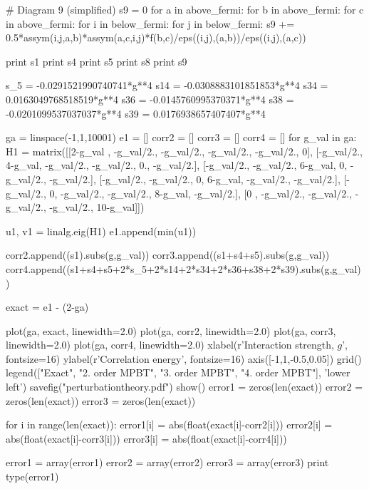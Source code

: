\documentclass[%
twoside,                 %
final,                   %
10pt]{article}
\newenvironment{doconceexercise}{}{}
\begin{document}
\begin{doconceexercise}
# Diagram 9 (simplified)
s9 = 0 
for a in above_fermi:
	for b in above_fermi:
		for c in above_fermi:
			for i in below_fermi:
				for j in below_fermi:
					s9 += 0.5*assym(i,j,a,b)*assym(a,c,i,j)*f(b,c)/eps((i,j),(a,b))/eps((i,j),(a,c))


print s1
print s4
print s5
print s8
print s9

s_5 =  -0.0291521990740741*g**4
s14 =  -0.0308883101851853*g**4
s34 =  0.0163049768518519*g**4
s36 =  -0.0145760995370371*g**4
s38 =  -0.0201099537037037*g**4
s39 =  0.0176938657407407*g**4

ga = linspace(-1,1,10001)
e1 = []
corr2 = []
corr3 = []
corr4 = []
for g_val in ga:
	H1 = matrix([[2-g_val , -g_val/2.,  -g_val/2., -g_val/2., -g_val/2.,     0], 
		        [-g_val/2.,   4-g_val,  -g_val/2., -g_val/2.,    0., -g_val/2.],
		        [-g_val/2., -g_val/2.,    6-g_val,     0, -g_val/2., -g_val/2.],
				[-g_val/2., -g_val/2.,      0,   6-g_val, -g_val/2., -g_val/2.],
				[-g_val/2.,     0,  -g_val/2., -g_val/2.,   8-g_val, -g_val/2.],
				[0    , -g_val/2.,  -g_val/2., -g_val/2., -g_val/2.,  10-g_val]]) 

	u1, v1 = linalg.eig(H1)
	e1.append(min(u1))

	corr2.append((s1).subs(g,g_val))
	corr3.append((s1+s4+s5).subs(g,g_val))
	corr4.append((s1+s4+s5+2*s_5+2*s14+2*s34+2*s36+s38+2*s39).subs(g,g_val))

exact = e1 - (2-ga)

plot(ga, exact, linewidth=2.0)
plot(ga, corr2, linewidth=2.0)
plot(ga, corr3, linewidth=2.0)
plot(ga, corr4, linewidth=2.0)
xlabel(r'Interaction strength, $g$', fontsize=16)
ylabel(r'Correlation energy', fontsize=16)
axis([-1,1,-0.5,0.05])
grid()
legend(["Exact", "2. order MPBT", "3. order MPBT", "4. order MPBT"], 'lower left')
savefig("perturbationtheory.pdf")
show()
error1 = zeros(len(exact))
error2 = zeros(len(exact))
error3 = zeros(len(exact))

for i in range(len(exact)):
	error1[i] = abs(float(exact[i]-corr2[i]))
	error2[i] = abs(float(exact[i]-corr3[i]))
	error3[i] = abs(float(exact[i]-corr4[i]))

error1 = array(error1)
error2 = array(error2)
error3 = array(error3)
print type(error1)


\end{doconceexercise}
\end{document}
